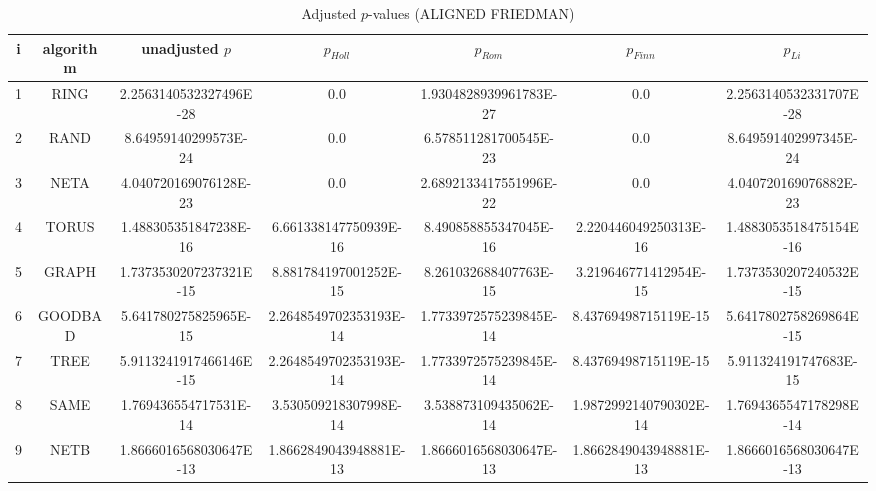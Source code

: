 \documentclass[a4paper,10pt]{article}
\begin{document}
\begin{landscape}
\begin{table}[!htp]
\centering\scriptsize
\caption{Adjusted $p$-values (ALIGNED FRIEDMAN)}
\begin{tabular}{ccccccc}
i&algorithm&unadjusted $p$&$p_{Holl}$&$p_{Rom}$&$p_{Finn}$&$p_{Li}$\\
\hline
1& RING&2.2563140532327496E-28&0.0&1.9304828939961783E-27&0.0&2.2563140532331707E-28\\
2& RAND&8.64959140299573E-24&0.0&6.578511281700545E-23&0.0&8.649591402997345E-24\\
3& NETA&4.040720169076128E-23&0.0&2.6892133417551996E-22&0.0&4.040720169076882E-23\\
4& TORUS&1.488305351847238E-16&6.661338147750939E-16&8.490858855347045E-16&2.220446049250313E-16&1.4883053518475154E-16\\
5& GRAPH&1.7373530207237321E-15&8.881784197001252E-15&8.261032688407763E-15&3.219646771412954E-15&1.7373530207240532E-15\\
6& GOODBAD&5.641780275825965E-15&2.2648549702353193E-14&1.7733972575239845E-14&8.43769498715119E-15&5.6417802758269864E-15\\
7& TREE&5.9113241917466146E-15&2.2648549702353193E-14&1.7733972575239845E-14&8.43769498715119E-15&5.911324191747683E-15\\
8& SAME&1.769436554717531E-14&3.530509218307998E-14&3.538873109435062E-14&1.9872992140790302E-14&1.7694365547178298E-14\\
9& NETB&1.8666016568030647E-13&1.8662849043948881E-13&1.8666016568030647E-13&1.8662849043948881E-13&1.8666016568030647E-13\\
\hline
\end{tabular}
\end{table}


\newpage


\end{landscape}
\end{document}
